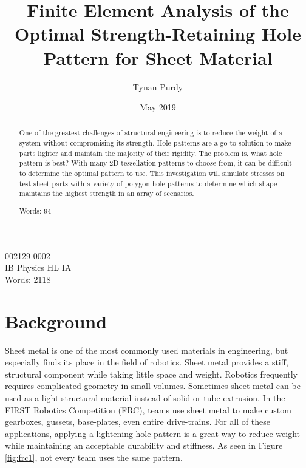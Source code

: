 \documentclass[12pt, letterpaper]{article}
\title{Finite Element Analysis of the Optimal Strength-Retaining Hole Pattern for Sheet Material}
\author{Tynan Purdy}
\date{May 2019}
\begin{document}
\nocite{*}
\large
\doublespace{}
\parindent=0.5in

{\fontsize{12}{14.4}
  {\singlespace
    \maketitle
    \begin{center}
    002129-0002 \\
    \vspace{4mm}
    IB Physics HL IA \\
    \vspace{4mm}
    Words: 2118  \\ %
    \end{center}
  }
}	

\newpage
{}

\begin{abstract}
One of the greatest challenges of structural engineering is to reduce the weight of a system without compromising its strength. Hole patterns are a go-to solution to make parts lighter and maintain the majority of their rigidity. The problem is, what hole pattern is best? With many 2D tessellation patterns to choose from, it can be difficult to determine the optimal pattern to use. This investigation will simulate stresses on test sheet parts with a variety of polygon hole patterns to determine which shape maintains the highest strength in an array of scenarios. 

Words: 94 %

\end{abstract}

\newpage
\tableofcontents
\newpage

\section{Background}
\label{sec:background}

Sheet metal is one of the most commonly used materials in engineering, but especially finds its place in the field of robotics. Sheet metal provides a stiff, structural component while taking little space and weight. Robotics frequently requires complicated geometry in small volumes. Sometimes sheet metal can be used as a light structural material instead of solid or tube extrusion. In the FIRST Robotics Competition (FRC), teams use sheet metal to make custom gearboxes, gussets, base-plates, even entire drive-trains. For all of these applications, applying a lightening hole pattern is a great way to reduce weight while maintaining an acceptable durability and stiffness. As seen in Figure \ref{fig:frc1}, not every team uses the same pattern.
\end{document}
